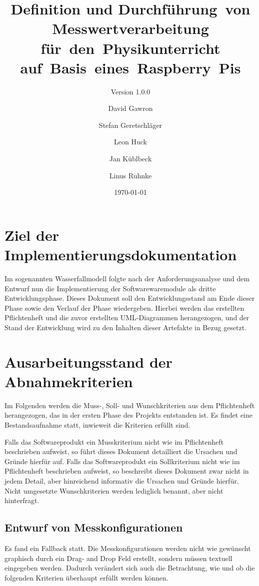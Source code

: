 \documentclass[parskip=full]{scrartcl}
\title{Definition und Durchführung~von Messwertverarbeitung für~den~Physikunterricht auf~Basis~eines~Raspberry~Pis}
\subtitle{Version 1.0.0}
\author{David Gawron \and Stefan Geretschläger \and Leon Huck \and Jan Küblbeck \and Linus Ruhnke}
\date{\today}
\begin{document}
\maketitle

\clearpage
\tableofcontents 					%

\clearpage
\section{Ziel der Implementierungsdokumentation} \label{einleitung}

Im sogenannten Wasserfallmodell folgte nach der Anforderungsanalyse und dem Entwurf nun die Implementierung der Softwarewaremodule als dritte Entwicklungsphase. Dieses Dokument soll den Entwicklungsstand am Ende dieser Phase sowie den Verlauf der Phase wiedergeben. Hierbei werden das erstellten Pflichtenheft und die zuvor erstellten UML-Diagrammen herangezogen, und der Stand der Entwicklung wird zu den Inhalten dieser Artefakte in Bezug gesetzt.

\clearpage
\section{Ausarbeitungsstand der Abnahmekriterien} \label{Ausarbeitungsstand}

Im Folgenden werden die Muss-, Soll- und Wunschkriterien aus dem Pflichtenheft herangezogen, das in der ersten Phase des Projekts entstanden ist. Es findet eine Bestandsaufnahme statt, inwieweit die Kriterien erfüllt sind. 

Falls das Softwareprodukt ein Musskriterium nicht wie im Pflichtenheft beschrieben aufweist, so führt dieses Dokument detailliert die Ursachen und Gründe hierfür auf. Falls das Softwareprodukt ein Sollkriterium nicht wie im Pflichtenheft beschrieben aufweist, so beschreibt dieses Dokument zwar nicht in jedem Detail, aber hinreichend informativ die Ursachen und Gründe hierfür. Nicht umgesetzte Wunschkriterien werden lediglich benannt, aber nicht hinterfragt. 

\subsection{Entwurf von Messkonfigurationen}
Es fand ein Fallback statt. Die Messkonfigurationen werden nicht wie gewünscht graphisch durch ein Drag- and Drop Feld erstellt, sondern müssen textuell eingegeben werden. Dadurch verändert sich auch die Betrachtung, wie und ob die folgenden Kriterien überhaupt erfüllt werden können.
\end{document}
